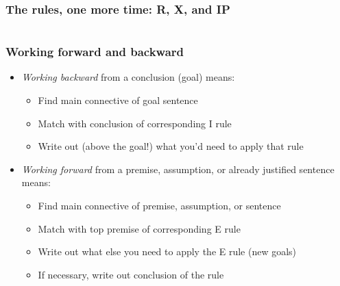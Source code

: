 \begin{frame}
  \frametitle{The rules, one more time: R, X, and IP}
\begin{columns}
  \begin{column}{3cm}
    \begin{fitchproof}
       
    \end{fitchproof}
    \begin{fitchproof}
       
    \end{fitchproof}
  \end{column}
  \begin{column}{3cm}
  \begin{fitchproof}
    \open
    \ellipsesline
    \close
     
  \end{fitchproof}
    \end{column}
\end{columns}
\end{frame}

\begin{frame}
  \frametitle{Working forward and backward}

  \begin{itemize}[<+->]
    \item \emph{Working backward} from a conclusion (goal) means:
    \begin{itemize}[<+->]
      \item Find main connective of goal sentence
      \item Match with conclusion of corresponding I rule
      \item Write out (above the goal!) what you'd need to apply that rule
    \end{itemize}
    \item \emph{Working forward} from a premise, assumption, or
    already justified sentence means:
    \begin{itemize}[<+->]
      \item Find main connective of premise, assumption, or sentence
      \item Match with top premise of corresponding E rule
      \item Write out what else you need to apply the E rule (new goals)
      \item If necessary, write out conclusion of the rule
    \end{itemize}
  \end{itemize}
\end{frame}

